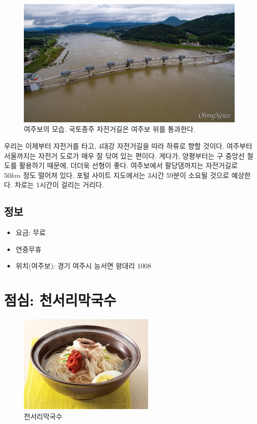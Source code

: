 \begin{figure}[ht]
    \centering
    \includegraphics[width=.6\textwidth]{img/여주보.jpg}
    \caption{여주보의 모습. 국토종주 자전거길은 여주보 위를 통과한다. \protect\footnotemark}
    \label{fig:my_labe7}
\end{figure}


우리는 이제부터 자전거를 타고, 4대강 자전거길을 따라 하류로 향할 것이다.
여주부터 서울까지는 자전거 도로가 매우 잘 닦여 있는 편이다.
게다가, 양평부터는 구 중앙선 철도를 활용하기 때문에, 더더욱 선형이 좋다.
여주보에서 팔당댐까지는 자전거길로 $50km$ 정도 떨어져 있다. 
포털 사이트 지도에서는 3시간 59분이 소요될 것으로 예상한다.
차로는 1시간이 걸리는 거리다.

\subsection{정보}
\begin{itemize}
    \item 요금: 무료
    \item 연중무휴
    \item 위치(여주보): 경기 여주시 능서면 왕대리 1008 
\end{itemize}

\section{점심: 천서리막국수}


\begin{figure}[ht]
    \centering
    \includegraphics[width=.6\textwidth]{img/막국수.jpg}
    \caption{천서리막국수\protect\footnotemark}
    \label{fig:my_labe71}
\end{figure}
\footnotetext{\href{https://terms.naver.com/entry.naver?docId=1627391&cid=48179&categoryId=48238}{[천서리막국수 $|$ 전통향토음식 용어사전}}




